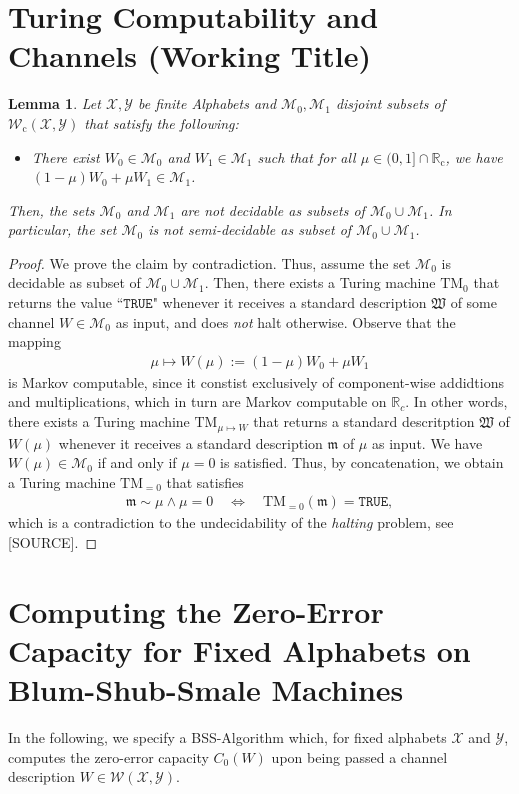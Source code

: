 \documentclass[conference]{IEEEtran}
\def\X{{\mathcal X}}
\def\Y{{\mathcal Y}}
\def\M{{\mathcal M}}
\def\W{{\mathcal W}}
\def\RR{{\mathbb R}}
\newcommand{\RRc}{\RR_{\mathrm{c}}}
\newcommand{\TM}{\mathrm{TM}}
\newcommand{\Wc}{\W_{\mathrm{c}}}
\newcommand{\sdummy}{{\color{red}[SOURCE]}}
\newtheorem{Lemma}[Theorem]{Lemma}
\begin{document}
\section{Turing Computability and Channels (Working Title)}
	\begin{Lemma}	Let \(\X,\Y\) be finite Alphabets and \(\M_0, \M_1\) disjoint subsets of \(\Wc(\X,\Y)\) that satisfy the following:
					\begin{itemize}	\item There exist \(W_0\in\M_0\) and \(W_1\in\M_1\) such that for all \(\mu \in (0,1]\cap \RRc\), 													
										we have \((1-\mu)W_0 + \mu W_1 \in \M_1\). 
					\end{itemize}
					Then, the sets \(\M_0\) and \(\M_1\) are \emph{not} decidable as subsets of \(\M_0 \cup \M_1\). In particular, the set 
					\(\M_0\) is \emph{not} semi-decidable as subset of \(\M_0 \cup \M_1\).
	\end{Lemma}\begin{proof}
					We prove the claim by contradiction. Thus, assume the set \(\M_0\) is decidable as subset of \(\M_0 \cup \M_1\). 
					Then, there exists a Turing machine \(\TM_0\) that returns the value ``\(\mathtt{TRUE}\)" whenever it receives a standard description
					\(\mathfrak{W}\) of some channel \(W\in \M_0\) as input, and does \emph{not} halt otherwise. Observe that the mapping
					\begin{align}	\mu \mapsto W(\mu) := (1-\mu)W_0 + \mu W_1
					\end{align} 
					is Markov computable, since it constist exclusively of component-wise addidtions and multiplications, which in turn are Markov computable on \(\RR_c\).
					In other words, there exists a Turing machine \(\TM_{\mu\mapsto W}\) that returns a standard descritption \(\mathfrak{W}\) of 
					\(W(\mu)\) whenever it receives a standard description \(\mathfrak{m}\) of \(\mu\) as input. We have \(W(\mu) \in \M_0\) if and only if
					\(\mu = 0\) is satisfied. Thus, by concatenation, we obtain a Turing machine
					\(\TM_{=0}\) that satisfies
					\begin{align}	\mathfrak{m} \sim \mu \wedge \mu = 0	\quad\Leftrightarrow\quad  \TM_{=0}(\mathfrak{m}) = \mathtt{TRUE},
					\end{align}
					which is a contradiction to the undecidability of the \emph{halting} problem, see \sdummy.
	\end{proof}

\section{Computing the Zero-Error Capacity for Fixed Alphabets on Blum-Shub-Smale Machines}	\label{sec:ComputingZeroErrorOnBSS}
	\noindent In the following, we specify a BSS-Algorithm which, for fixed alphabets \(\X\) and \(\Y\), computes the zero-error capacity \(C_0(W)\) 
	upon being passed a channel description \(W \in \W(\X,\Y)\). 
\end{document}
